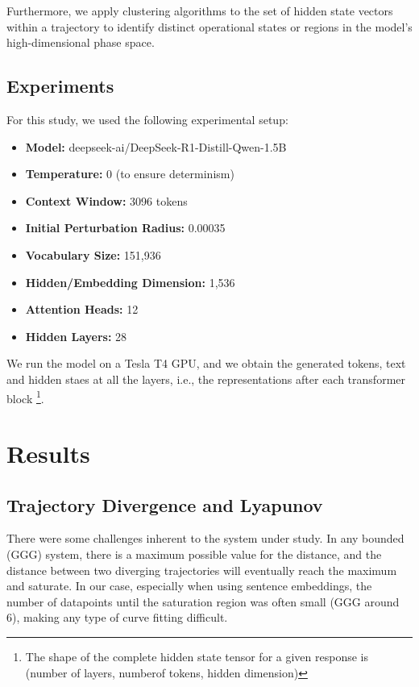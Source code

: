 \documentclass[a4paper,12pt]{article}
\begin{document}
Furthermore, we apply clustering algorithms to the set of hidden state vectors within a trajectory to identify distinct operational states or regions in the model's high-dimensional phase space.

\subsection{Experiments}

For this study, we used the following experimental setup:
\begin{itemize}
    \item \textbf{Model:} deepseek-ai/DeepSeek-R1-Distill-Qwen-1.5B
    \item \textbf{Temperature:} 0 (to ensure determinism)
    \item \textbf{Context Window:} 3096 tokens
    \item \textbf{Initial Perturbation Radius:} 0.00035
    \item \textbf{Vocabulary Size:} 151,936
    \item \textbf{Hidden/Embedding Dimension:} 1,536
    \item \textbf{Attention Heads:} 12
    \item \textbf{Hidden Layers:} 28
\end{itemize}

We run the model on a Tesla T4 GPU, and we obtain the generated tokens, text and hidden staes at all the layers, i.e., the representations after each transformer block \footnote{The shape of the complete hidden state tensor for a given response is (number of layers, numberof tokens, hidden dimension)}.

\section{Results}

\subsection{Trajectory Divergence and Lyapunov} \label{res:lyapunov} %
\label{subsec:lyapunov} 

There were some challenges inherent to the system under study. In any bounded (GGG) system, there is a maximum possible value for the distance, and the distance between two diverging trajectories will eventually reach the maximum and saturate. In our case, especially when using sentence embeddings, the number of datapoints until the saturation region was often small (GGG around 6), making any type of curve fitting difficult.
\end{document}
